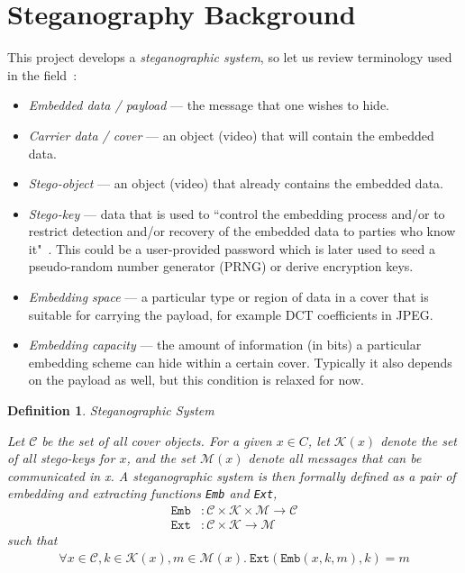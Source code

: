 \documentclass[12pt,british,twoside,notitlepage,usenames,dvipsnames,hypens,final]{report}
\newtheorem{definition}{Definition}
\numberwithin{equation}{section}
\numberwithin{figure}{section}
\begin{document}
\section{Steganography Background}

This project develops a \emph{steganographic system}, so let us review terminology used in the field~\cite{infohiding-survey, bateman}:
\begin{itemize}
\item \emph{Embedded data / payload} --- the message that one wishes to hide.
\item \emph{Carrier data / cover} --- an object (video) that will contain the embedded data.
\item \emph{Stego-object } --- an object (video) that already contains the embedded data.
\item \emph{Stego-key} ---  data that is used to ``control the embedding process and/or to restrict detection and/or recovery of the embedded data to parties who know it"~\cite{infohiding-survey}. This could be a user-provided password which is later used to seed a pseudo-random number generator (PRNG) or derive encryption keys. 
\item \emph{Embedding space} --- a particular type or region of data in a cover that is suitable for carrying the payload, for example DCT coefficients in JPEG.
\item \emph{Embedding capacity} --- the amount of information (in bits) a particular embedding scheme can hide within a certain cover. Typically it also depends on the payload as well, but this condition is relaxed for now.
\end{itemize}

\begin{definition}{Steganographic System~\cite[p.~53]{fridrich}}

Let $\mathcal{C}$ be the set of all cover objects. For a given $x \in C$, let $\mathcal{K}(x)$ denote the set of all stego-keys for $x$, and the set $\mathcal{M}(x)$ denote all messages that can be communicated in x. A steganographic system is then formally defined as a pair of embedding and extracting functions \texttt{Emb} and \texttt{Ext},
\begin{align*}
\texttt{Emb} &: \mathcal{C} \times \mathcal{K} \times \mathcal{M} \rightarrow \mathcal{C} \\
\texttt{Ext} &: \mathcal{C} \times \mathcal{K} \rightarrow \mathcal{M}
\end{align*}
\vspace{-1mm}
such that
\vspace{-1mm}
\begin{align*}
\forall x \in \mathcal{C}, k \in \mathcal{K}(x), m \in \mathcal{M}(x) . ~ \texttt{Ext}(\texttt{Emb}(x, k, m), k) = m
\end{align*}

\end{definition}
\end{document}
